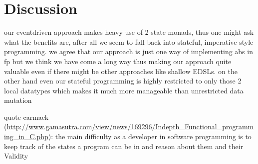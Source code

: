 \section{Discussion}
our eventdriven approach makes heavy use of 2 state monads, thus one might ask what the benefits are, after all we seem to fall back into stateful, imperative style programming. we agree that our approach is just one way of implementing abs in fp but we think we have come a long way thus making our approach quite valuable even if there might be other approaches like shallow EDSLs. on the other hand even our stateful programming is highly restricted to only those 2 local datatypes which makes it much more manageable than unrestricted data mutation

quote carmack (\url{http://www.gamasutra.com/view/news/169296/Indepth_Functional_programming_in_C.php}): the main difficulty as a developer in software programming is to keep track of the states a program can be in and reason about them and their Validity